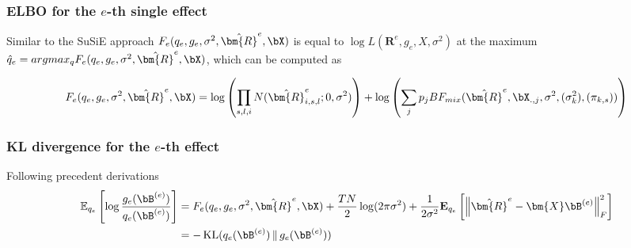  






\subsubsection{ELBO for the $e$-th single effect}

Similar to the SuSiE approach $F_e(q_e,g_e, \sigma^2,\hat{\bm{R}}^e,\bX)$ is equal to $\log L (\bm{R}^e , g_e, X, \sigma^2)$ at the maximum $\hat{q}_e= argmax_q F_e(q_e,g_e, \sigma^2,\hat{\bm{R}}^e,\bX)$, which can be computed as 

\begin{align}
    F_e(q_e,g_e, \sigma^2,\hat{\bm{R}}^e,\bX)= \log \left( \prod_{s,l,i} N(\hat{\bm{R}}^e_{i,s,l};0,\sigma^2) \right) + \log \left( \sum_j p_j BF_{mix} (\hat{\bm{R}}^e,\bX_{.,j},\sigma^2, (\sigma^2_{k}) ,(\pi_{k,s}))\right)
\end{align}


\subsubsection{KL divergence for the $e$-th effect}
Following precedent derivations 
\begin{align}
 \mathbb{E}_{q_e}\left[  \log \frac{g_e(\bB^{(e)})}{q_e(\bB^{(e)})}\right] & = F_e(q_e,g_e, \sigma^2,\hat{\bm{R}}^e,\bX) + \frac{T N}{2} \log(2\pi \sigma^2) + \frac{1}{2\sigma^2} \mathbf{E}_{q_e}\left[ \left\| \hat{\bm{R}}^e - \bm{X} \bB^{(e)} \right\|_F^2\right]\\
&= -\operatorname{KL}(q_e(\bB^{(e)})\,\|\,g_e(\bB^{(e)}))
\end{align}





